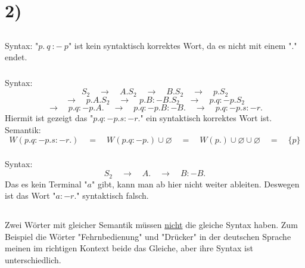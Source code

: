 \documentclass[12pt]{article}
\date{}
\begin{document}
\section{2)}
\subsection{}
\subsubsection{}
\begin{center}
    Syntax:\bigbreak
    "$p.\:q\::-\:p$" ist kein syntaktisch korrektes Wort, da es nicht mit einem "." endet.
\end{center}

\subsubsection{}
\begin{center}
    Syntax:
    $$ S_2 \quad \rightarrow \quad A.S_2 \quad \rightarrow \quad B.S_2 \quad \rightarrow \quad p.S_2 $$
    $$\rightarrow \quad p.A.S_2 \quad \rightarrow \quad p.B:-B.S_2 \quad \rightarrow \quad p.q:-p.S_2$$
    $$ \rightarrow \quad p.q:-p.A. \quad \rightarrow \quad p.q:-p.B:-B. \quad \rightarrow \quad p.q:-p.s:-r.$$
    \bigbreak
    Hiermit ist gezeigt das "$p.q:-p.s:-r.$" ein syntaktisch korrektes Wort ist.
    \bigbreak
    Semantik:
    $$ W(p.q:-p.s:-r.) \quad = \quad W(p.q:-p.) \cup \varnothing \quad = \quad W(p.)\cup \varnothing \cup \varnothing \quad = \quad \{ p \} $$
\end{center}

\subsubsection{}
\begin{center}
    Syntax:
    $$ S_2 \quad \rightarrow \quad A. \quad \rightarrow \quad B:-B. $$
    \bigbreak
    Das es kein Terminal "$a$" gibt, kann man ab hier nicht weiter ableiten. Deswegen ist das Wort "$a :- r.$" syntaktisch falsch. 
\end{center}

\subsection{}
\begin{center}
    Zwei Wörter mit gleicher Semantik müssen \underline{nicht} die gleiche Syntax haben. Zum Beispiel die Wörter "Fehrnbedienung" und "Drücker" in der deutschen Sprache meinen im richtigen Kontext beide das Gleiche, aber ihre Syntax ist unterschiedlich.
\end{center}
\end{document}

